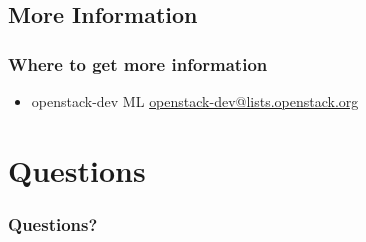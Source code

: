 \documentclass[aspectratio=169,11pt,hyperref={colorlinks=true}]{beamer}
\begin{document}
\subsection{More Information}
\begin{frame}
\frametitle{Where to get more information}
    \begin{itemize}
        \item openstack-dev ML\: \href{mailto:openstack-dev@lists.openstack.org}{openstack-dev@lists.openstack.org}
   \end{itemize}
\end{frame}

\section{Questions}
\begin{frame}
\frametitle{Questions?}
\end{frame}
\end{document}
